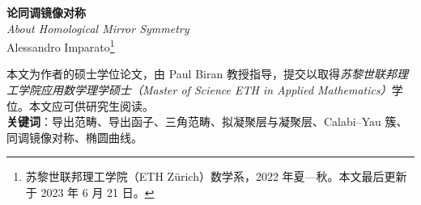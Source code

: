 
\begin{titlepage}
	\begin{center}

		\LARGE \textbf{论同调镜像对称}\\[0.6cm]

		{\large \textit{About Homological Mirror Symmetry}}\\[1.2cm]

		\Large Alessandro Imparato\footnote{苏黎世联邦理工学院（ETH Zürich）数学系，2022 年夏—秋。本文最后更新于 2023 年 6 月 21 日。}\\[2.4cm]


		\begin{abstract}
			本文讨论 Kontsevich 同调镜像对称猜想的 \textbf{B-侧}。我们首先对导出范畴及其同调代数作一自足的研讨；随后把范围收缩到概形的有界导出范畴，并最终落实到 Calabi--Yau 流形，尤其着重于作为其基础的层论之基本内容及其中的代数特征。最后，我们粗略地讨论同调镜像对称在最低维的若干表现，即椭圆曲线与 $K3$ 曲面情形。

			本文是作者关于同调镜像对称 A-侧的综述 \cite{[Imp21]} 的续篇。
		\end{abstract}

	\end{center}

	\vspace*{4cm}

	\noindent 本文为作者的硕士学位论文，由 Paul Biran 教授指导，提交以取得\textit{苏黎世联邦理工学院应用数学理学硕士（Master of Science ETH in Applied Mathematics）}学位。本文应可供研究生阅读。\\

	\noindent\normalsize\textbf{关键词}：导出范畴、导出函子、三角范畴、拟凝聚层与凝聚层、Calabi--Yau 簇、同调镜像对称、椭圆曲线。

\end{titlepage}


\newpage
\thispagestyle{plain}
\vspace*{0.5cm}

